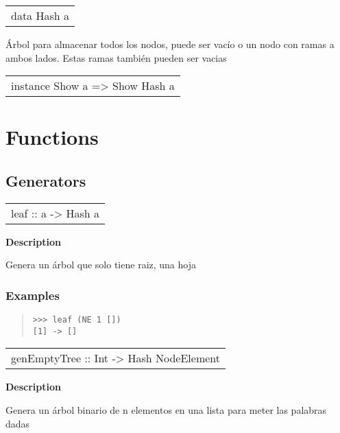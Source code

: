 \begin{haddockdesc}
\item[\begin{tabular}{@{}l}
data Hash a
\end{tabular}]
{\haddockbegindoc
Árbol para almacenar todos los nodos, puede ser vacío o un nodo con ramas a ambos lados. Estas ramas también pueden ser vacias\par}
\end{haddockdesc}
\begin{haddockdesc}
\item[\begin{tabular}{@{}l}
instance Show a => Show Hash a
\end{tabular}]
\end{haddockdesc}
\section{Functions}
\subsection{Generators}
\begin{haddockdesc}
\item[\begin{tabular}{@{}l}
leaf :: a -> Hash a
\end{tabular}]
{\haddockbegindoc
\textbf{Description}\par
Genera un árbol que solo tiene raiz, una hoja\par
\subsubsection*{\textbf{Examples}}
\begin{quote}
{\haddockverb\begin{verbatim}
>>> leaf (NE 1 [])
[1] -> []

\end{verbatim}}
\end{quote}}
\end{haddockdesc}
\begin{haddockdesc}
\item[\begin{tabular}{@{}l}
genEmptyTree :: {\char 91}Int{\char 93} -> Hash NodeElement
\end{tabular}]
{\haddockbegindoc
\textbf{Description}\par
Genera un árbol binario de n elementos en una lista para meter las palabras dadas\par}
\end{haddockdesc}
